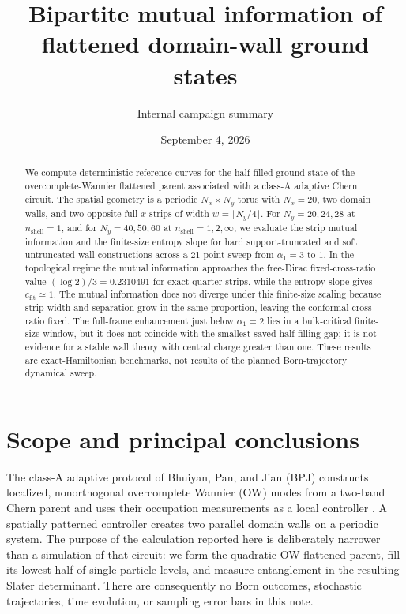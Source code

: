\documentclass[aps,prb,twocolumn,nofootinbib,superscriptaddress,floatfix]{revtex4-2}
\newcommand{\cfit}{c_{\mathrm{fit}}}
\begin{document}
\title{Bipartite mutual information of flattened domain-wall ground states}
\author{Internal campaign summary}
\date{September 4, 2026}

\begin{abstract}
We compute deterministic reference curves for the half-filled ground state of
the overcomplete-Wannier flattened parent associated with a class-A adaptive
Chern circuit.  The spatial geometry is a periodic $N_x\times N_y$ torus
with $N_x=20$, two domain walls, and two opposite full-$x$ strips of width
$w=\lfloor N_y/4\rfloor$.  For $N_y=20,24,28$ at
$n_{\mathrm{shell}}=1$, and for $N_y=40,50,60$ at
$n_{\mathrm{shell}}=1,2,\infty$, we evaluate the strip mutual information and
the finite-size entropy slope for hard support-truncated and soft untruncated
wall constructions across a 21-point sweep from $\alpha_1=3$ to $1$.  In the
topological regime the mutual information approaches the free-Dirac
fixed-cross-ratio value $(\log 2)/3=0.2310491$ for exact quarter strips, while
the entropy slope gives $\cfit\simeq1$.  The mutual information does not
diverge under this finite-size scaling because strip width and separation grow
in the same proportion, leaving the conformal cross-ratio fixed.  The
full-frame enhancement just below $\alpha_1=2$ lies in a bulk-critical
finite-size window, but it does not coincide with the smallest saved
half-filling gap; it is not evidence for a stable wall theory with central
charge greater than one.  These
results are exact-Hamiltonian benchmarks, not results of the planned
Born-trajectory dynamical sweep.
\end{abstract}

\maketitle
\setcounter{tocdepth}{2}
\tableofcontents

\section{Scope and principal conclusions}
\label{sec:scope}

The class-A adaptive protocol of Bhuiyan, Pan, and Jian (BPJ) constructs
localized, nonorthogonal overcomplete Wannier (OW) modes from a two-band Chern
parent and uses their occupation measurements as a local controller
\cite{BhuiyanPanJian2026}.  A spatially patterned controller creates two
parallel domain walls on a periodic system.  The purpose of the calculation
reported here is deliberately narrower than a simulation of that circuit: we
form the quadratic OW flattened parent, fill its lowest half of single-particle
levels, and measure entanglement in the resulting Slater determinant.  There
are consequently no Born outcomes, stochastic trajectories, time evolution,
or sampling error bars in this note.
\end{document}
